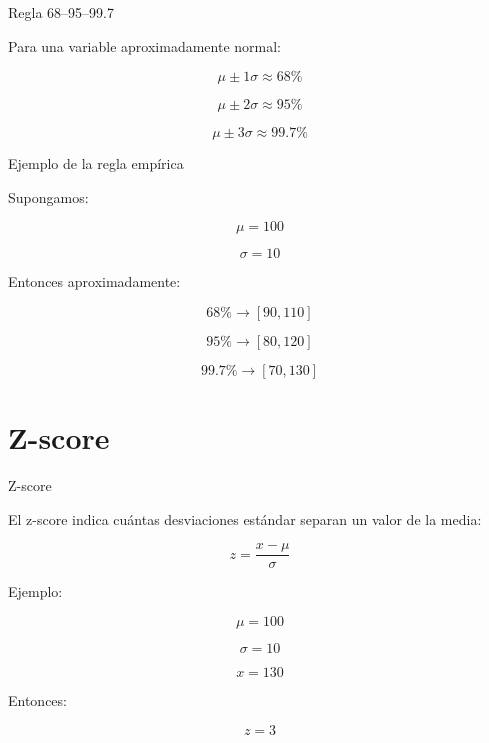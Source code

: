 \documentclass[aspectratio=169,11pt]{beamer}
\begin{document}

\begin{frame}{Regla 68--95--99.7}

Para una variable aproximadamente normal:

\[
\mu \pm 1\sigma
\approx
68\%
\]

\[
\mu \pm 2\sigma
\approx
95\%
\]

\[
\mu \pm 3\sigma
\approx
99.7\%
\]

\end{frame}


\begin{frame}{Ejemplo de la regla empírica}

Supongamos:

\[
\mu = 100
\]

\[
\sigma = 10
\]

Entonces aproximadamente:

\[
68\%
\rightarrow
[90,110]
\]

\[
95\%
\rightarrow
[80,120]
\]

\[
99.7\%
\rightarrow
[70,130]
\]

\end{frame}

\section{Z-score}

\begin{frame}{Z-score}

El z-score indica cuántas desviaciones estándar separan un valor de la media:

\[
z
=
\frac{x-\mu}{\sigma}
\]

Ejemplo:

\[
\mu=100
\]

\[
\sigma=10
\]

\[
x=130
\]

Entonces:

\[
z=3
\]

\end{frame}

\end{document}
